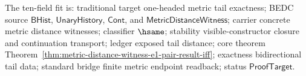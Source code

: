 The ten-field fit is: traditional target one-headed metric tail exactness;
BEDC source $\mathsf{BHist}$, $\mathsf{UnaryHistory}$, $\mathsf{Cont}$, and
$\mathsf{MetricDistanceWitness}$; carrier concrete metric distance witnesses;
classifier $\hsame$; stability visible-constructor closure and continuation
transport; ledger exposed tail distance; core theorem
Theorem~\ref{thm:metric-distance-witness-e1-pair-result-iff};
exactness bidirectional tail data; standard bridge finite metric endpoint
readback; status $\mathsf{ProofTarget}$.
